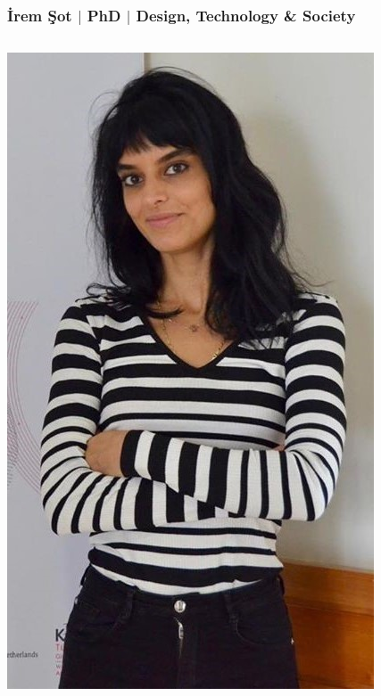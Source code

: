       \begin{frame}
        \frametitle{İrem Şot $\mid$ PhD $\mid$ Design, Technology \& Society}
        \vspace{-4mm}
        \begin{columns}
          \begin{column}{0.3\textwidth}
            \centering
            \includegraphics[width=\textwidth]{images/isot.jpg}
          \end{column}
          \begin{column}{0.7\textwidth}

\end{column}
\end{columns}
\end{frame}
